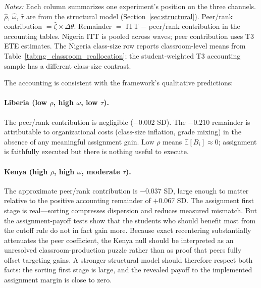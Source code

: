 \documentclass[11pt]{article}
\newcommand{\E}{\mathbb{E}}
\begin{document}
\begin{table}[H]
\begin{threeparttable}
\begin{tablenotes}
\item \textit{Notes:} Each column summarizes one experiment's position on the three channels. $\hat{\rho}$, $\hat{\omega}$, $\hat{\tau}$ are from the structural model (Section~\ref{sec:structural}). Peer/rank contribution $= \hat{\zeta} \times \Delta\bar{\theta}$. Remainder $=$ ITT $-$ peer/rank contribution in the accounting tables. Nigeria ITT is pooled across waves; peer contribution uses T3 ETE estimates. The Nigeria class-size row reports classroom-level means from Table~\ref{tab:ng_classroom_reallocation}; the student-weighted T3 accounting sample has a different class-size contrast.
\end{tablenotes}
\end{threeparttable}
\end{table}

The accounting is consistent with the framework's qualitative predictions:

\paragraph{Liberia (low $\rho$, high $\omega$, low $\tau$).} The peer/rank contribution is negligible ($-0.002$ SD). The $-0.210$ remainder is attributable to organizational costs (class-size inflation, grade mixing) in the absence of any meaningful assignment gain. Low $\rho$ means $\E[B_i] \approx 0$; assignment is faithfully executed but there is nothing useful to execute.

\paragraph{Kenya (high $\rho$, high $\omega$, moderate $\tau$).} The approximate peer/rank contribution is $-0.037$ SD, large enough to matter relative to the positive accounting remainder of $+0.067$ SD. The assignment first stage is real---sorting compresses dispersion and reduces measured mismatch. But the assignment-payoff tests show that the students who should benefit most from the cutoff rule do not in fact gain more. Because exact recentering substantially attenuates the peer coefficient, the Kenya null should be interpreted as an unresolved classroom-production puzzle rather than as proof that peers fully offset targeting gains. A stronger structural model should therefore respect both facts: the sorting first stage is large, and the revealed payoff to the implemented assignment margin is close to zero.
\end{document}
